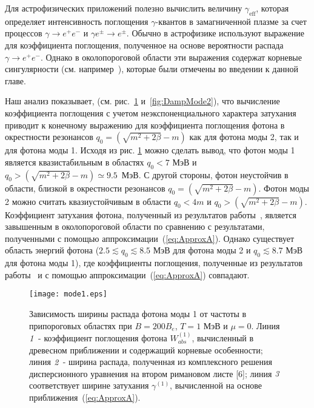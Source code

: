 Для астрофизических приложений полезно вычислить величину $\gamma_\text{eff}$, которая определяет интенсивность поглощения 
$\gamma$-квантов в замагниченной плазме за счет  процессов $\gamma \to e^+ e^-$  и $\gamma e^{\pm} \to e^{\pm}$.
Обычно в астрофизике  используют выражение для коэффициента поглощения,
полученное на основе  вероятности распада  $ \gamma \to e^+ e^-$. Однако в околопороговой области эти выражения
содержат корневые сингулярности (см. например~\cite{HBG:1997}), которые были отмечены во введении к данной главе. 

Наш анализ показывает, (см. рис.~\ref{fig:DampMode1} и~\ref{fig:DampMode2}),
что вычисление коэффициента  поглощения с учетом неэкспоненциального характера 
затухания приводит к конечному выражению для коэффициента  поглощения фотона в окрестности резонансов 
$q_0 = (\sqrt{m^2+2 \beta} - m )$ как для фотона моды 2, так и для фотона моды 1. Исходя из рис. \ref{fig:DampMode1} можно сделать вывод, что фотон моды 1 является квазистабильным в областях $q_0<7$ МэВ и $q_0>(\sqrt{m^2+2 \beta} - m)\simeq 9.5$~МэВ. С другой стороны, фотон неустойчив в области, близкой в окрестности резонансов $q_0 = (\sqrt{m^2+2 \beta} - m )$. Фотон моды 2 можно считать квазиустойчивым в области $q_0<4m$ и $q_0>(\sqrt{m^2+2 \beta} - m)$. Коэффициент затухания фотона, полученный из результатов работы~\cite{Shabad:1988}, является завышенным в околопороговой области по сравнению с результатами, полученными с помощью аппроксимации~(\ref{eq:ApproxA}). Однако существует область энергий фотона ($2.5\lesssim q_0\lesssim 8.5$ МэВ для фотона моды 2 и $q_0\lesssim8.7$ МэВ для фотона моды 1), где коэффициенты поглощения, полученные из результатов работы~\cite{Shabad:1988} и с помощью аппроксимации~(\ref{eq:ApproxA}) совпадают.


\begin{figure}[t]\centering
	\texttt{[image: mode1.eps]}
	\caption{\label{fig:fig1}Зависимость ширины распада фотона моды 1 от частоты в припороговых областях при $B=200 B_e$, $T=1$ МэВ и $ \mu=0 $. Линия $ {\it 1} $ - коэффициент поглощения фотона $ W ^ {(1)}_{abs} $,
		вычисленный в древесном приближении и содержащий корневые особенности; линия $ {\it 2} $ - ширина распада, полученная из комплексного решения дисперсионного уравнения на втором римановом листе [6]; линия $ {\it 3} $ соответствует ширине затухания $ \gamma^{(1)}$, вычисленной на основе приближения~(\ref{eq:ApproxA}).}\label{fig:DampMode1}
\end{figure}

